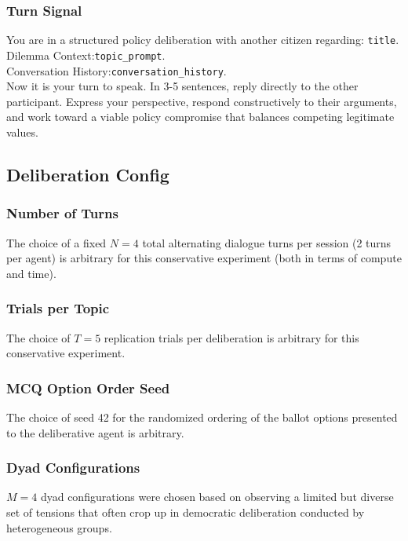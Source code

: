 \documentclass[titlepage]{article}
\begin{document}
\subsubsection{Turn Signal}
\begin{sidequote}
    You are in a structured policy deliberation with another citizen regarding: \texttt{title}.\\
    Dilemma Context:\texttt{topic\_prompt}.\\
    Conversation History:\texttt{conversation\_history}.\\
    Now it is your turn to speak. In 3-5 sentences, reply directly to the other participant. Express your perspective, respond constructively to their arguments, and work toward a viable policy compromise that balances competing legitimate values.
\end{sidequote}

\subsection{Deliberation Config}

\subsubsection{Number of Turns}
The choice of a fixed $N=4$ total alternating dialogue turns per session (2 turns per agent) is arbitrary for this conservative experiment (both in terms of compute and time).

\subsubsection{Trials per Topic}
The choice of $T=5$ replication trials per deliberation is arbitrary for this conservative experiment.

\subsubsection{MCQ Option Order Seed}
The choice of seed 42 for the randomized ordering of the ballot options presented to the deliberative agent is arbitrary.

\subsubsection{Dyad Configurations}
$M=4$ dyad configurations were chosen based on observing a limited but diverse set of tensions that often crop up in democratic deliberation conducted by heterogeneous groups.\\
\end{document}
